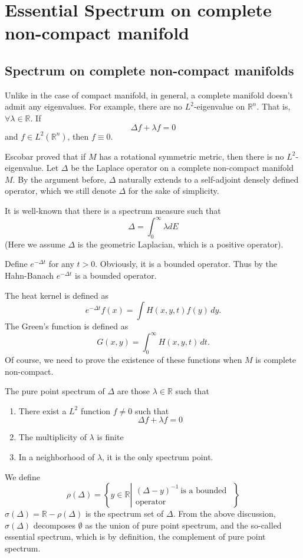 

\chapter{Essential Spectrum on complete non-compact manifold}
\section{Spectrum on complete non-compact manifolds}

Unlike in the case of compact manifold, in general, a complete manifold doesn't admit any eigenvalues. For example, there are no $ L^2$-eigenvalue on $\mathbb{R}^n$. That is, $ \forall \lambda \in \mathbb{R} $. If 
%
\[ \Delta f + \lambda f = 0 \]
%
and $ f \in L^2 (\mathbb{R}^n)$, then $ f \equiv 0$.

Escobar proved that if $M$ has a rotational symmetric metric, then there is no $ L^2$-eigenvalue. Let $ \Delta $ be the Laplace operator on a complete non-compact manifold $M$. By the argument before, $\Delta$ naturally extends to a self-adjoint densely defined operator, which we still denote $\Delta$ for the sake of simplicity.

It is well-known that there is a spectrum measure such that 
%
\[\Delta = \int^\infty _0 \lambda d E\]
(Here we assume $\Delta$ is the geometric Laplacian, which is a positive operator).

Define $ e^{-\Delta t} $ for any $ t > 0 $. Obviously, it is a bounded operator. Thus by the Hahn-Banach
$ e^{-\Delta t} $ is a bounded operator.

The heat kernel is defined as  
%
\[   e^{-\Delta t}   f(x) = \int H(x, y, t) f (y) \, dy.\]
%
The Green's function is defined as 
%
\[ G(x, y) = \int^\infty_0 H (x, y, t) \, dt .\]
Of course, we need to prove the existence of these functions when $M$ is complete non-compact.

The pure point spectrum of $ \Delta $ are those $ \lambda \in \mathbb{R} $ such that 
\begin{enumerate}
  \item There exist a $ L^2 $ function $ f \neq 0 $ such that 
   \[ \Delta f + \lambda f = 0 \]
  \item The multiplicity of $ \lambda $ is finite
  \item In a neighborhood of $ \lambda $, it is the only spectrum point.
 \end{enumerate} 
  We define 
%
\[ \rho (\Delta ) = \left\{ y \in \mathbb{R} \left| \begin{array}{r} (\Delta - y ) ^{-1} \ \mbox{is a bounded }\\
 \mbox{operator} \end{array} \right. \right\} \]
%
$ \sigma (\Delta ) = \mathbb{R} - \rho (\Delta) $ is the spectrum set of $ \Delta $. From the above discussion, $ \sigma (\Delta ) $ decomposes $ \emptyset $ as the union of pure point spectrum, and the so-called essential spectrum, which is by definition, the complement of pure point spectrum.

